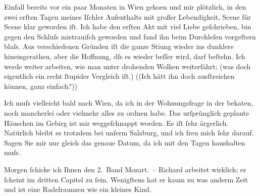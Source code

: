                Einfall bereits vor ein paar Monaten in Wien
                  geko{\geminationm}en und mir plötzlich, in den zwei erſten Tagen
               meines Iſchler {\pb}Aufenthalts mit großer Lebendigkeit, Scene für Scene klar geworden iſt. Ich habe
               den erſten Akt mit viel Liebe
               geſchrieben, bin gegen den Schluſs mistrauiſch geworden und fand ihn beim Durchleſen
               vorgeſtern blaſs. Aus verschiedenen Gründen iſt die ganze Sti{\geminationm}ung wieder ins dunklere hineingerathen, aber die
               Hoffnung, dſs es wieder beſſer wird, darf beſtehn. Ich werde weiter arbeiten, wie man
               unter drohenden Wolken weiterfährt; (was doch eigentlich ein recht{ }ſtupider Vergleich
               iſt.) ((Ich hätt ihn doch ausſtreichen können, ganz einfach?))\pend
           
\pstart
           {\pb}Ich muſs vielleicht bald nach Wien, da ich in der Wohnungsfrage in der beka{\geminationn}ten, noch mancherlei oder vielmehr alles zu ordnen
               habe. Das urſprünglich geplante Häuschen im Gebirg ist mir weggeſchnappt worden. Es
               iſt{ }ſehr ärgerlich. Natürlich bleibt es trotzdem bei unſerm Salzburg, und ich freu mich{ }ſehr darauf. Sagen Sie mir nur
               gleich das genaue Datum, da ich mit den Tagen haushalten muſs.\pend
           
\pstart
           Morgen{ }ſchicke ich Ihnen den 2. Band Mozart. – Richard arbeitet wirklich; er{ }ſcheint
               im dritten Capitel zu{ }ſein.
                  {\pb}Wenigſtens hat er kaum zu was anderm Zeit und ist eine
               Radelraunzen wie ein kleines Kind.\pend
           
